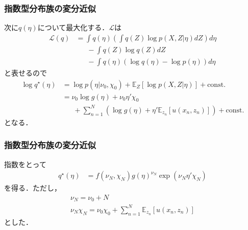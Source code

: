 \documentclass[10pt,usepdftitle=false,hyperref={unicode}]{beamer}
\newcommand{\parentheses}[1]{\left(#1\right)}
\newcommand{\brackets}[1]{\left[#1\right]}
\newcommand{\const}{\mathrm{const.}}
\newcommand{\energy}{\mathcal{L}}
\begin{document}
\begin{frame}
\frametitle{指数型分布族の変分近似}
次に$q\parentheses{\eta}$について最大化する．$\energy$は
\begin{align*}
    \energy\parentheses{q}
    &= \int q\parentheses{\eta} \parentheses{%
            \int q\parentheses{Z} \log p \parentheses{X,Z|\eta}dZ
        }d\eta \\
    &\phantom{=}\ -\int q\parentheses{Z} \log q \parentheses{Z} dZ \\
    &\phantom{=}\ -\int q\parentheses{\eta} \parentheses{\log q \parentheses{\eta} - \log p \parentheses{\eta}}d\eta
\end{align*}
と表せるので
\begin{align*}
    \log q^\star\parentheses{\eta}
    &= \log p\parentheses{\eta | \nu_0,\chi_0} + \mathbb{E}_{Z}\brackets{\log p \parentheses{X, Z | \eta}} + \const \tag{10.117} \\
    &= \nu_0 \log g \parentheses{\eta} + \nu_0 \eta' \chi_0 \\
    &\phantom{=}\ + \sum_{n = 1}^N \parentheses{\log g \parentheses{\eta} + \eta' \mathbb{E}_{z_n}\brackets{u\parentheses{x_n, z_n}}} + \const \tag{10.118}
\end{align*}
となる．
\end{frame}

\begin{frame}
\frametitle{指数型分布族の変分近似}
指数をとって
\begin{align}
    q^\star\parentheses{\eta}
    &= f\parentheses{\nu_N,\chi_N}g\parentheses{\eta}^{\nu_N}\exp\parentheses{\nu_N \eta' \chi_N} \tag{10.119}
\end{align}
を得る．ただし，
\begin{gather}
    \nu_N = \nu_0 + N \tag{10.120} \\
    \nu_N\chi_N = \nu_0 \chi_0 + \sum_{n = 1}^N \mathbb{E}_{z_n}\brackets{u\parentheses{x_n, z_n}} \tag{10.121}
\end{gather}
とした．
\end{frame}
\end{document}
